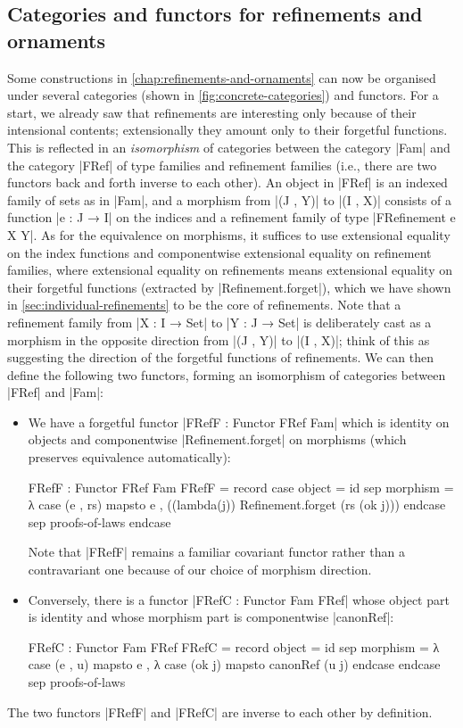 \subsection{Categories and functors for refinements and ornaments}
\label{sec:concrete-categories}

Some constructions in \autoref{chap:refinements-and-ornaments} can now be organised under several categories (shown in \autoref{fig:concrete-categories}) and functors.
For a start, we already saw that refinements are interesting only because of their intensional contents; extensionally they amount only to their forgetful functions.
This is reflected in an \emph{isomorphism} of categories between the category |Fam| and the category |FRef| of type families and refinement families (i.e., there are two functors back and forth inverse to each other).
An object in |FRef| is an indexed family of sets as in |Fam|, and a morphism from |(J , Y)| to |(I , X)| consists of a function |e : J → I| on the indices and a refinement family of type |FRefinement e X Y|.
As for the equivalence on morphisms, it suffices to use extensional equality on the index functions and componentwise extensional equality on refinement families, where extensional equality on refinements means extensional equality on their forgetful functions (extracted by |Refinement.forget|), which we have shown in \autoref{sec:individual-refinements} to be the core of refinements.
Note that a refinement family from |X : I → Set| to |Y : J → Set| is deliberately cast as a morphism in the opposite direction from |(J , Y)| to |(I , X)|; think of this as suggesting the direction of the forgetful functions of refinements.
We can then define the following two functors, forming an isomorphism of categories between |FRef| and |Fam|:
\begin{itemize}
\item We have a forgetful functor |FRefF : Functor FRef Fam| which is identity on objects and componentwise |Refinement.forget| on morphisms (which preserves equivalence automatically):
\begin{code}
FRefF : Functor FRef Fam
FRefF = record
  case  object     = id
  sep   morphism   = λ case (e , rs) mapsto e , ((lambda(j)) Refinement.forget (rs (ok j))) endcase
  sep   proofs-of-laws endcase
\end{code}
Note that |FRefF| remains a familiar covariant functor rather than a contravariant one because of our choice of morphism direction.
\item Conversely, there is a functor |FRefC : Functor Fam FRef| whose object part is identity and whose morphism part is componentwise |canonRef|:
\begin{code}
FRefC : Functor Fam FRef
FRefC = record
  {    object    =  id
  sep  morphism  =  λ case (e , u) mapsto e , λ case (ok j) mapsto canonRef (u {j}) endcase endcase
  sep  proofs-of-laws }
\end{code}
\end{itemize}
The two functors |FRefF| and |FRefC| are inverse to each other by definition.

